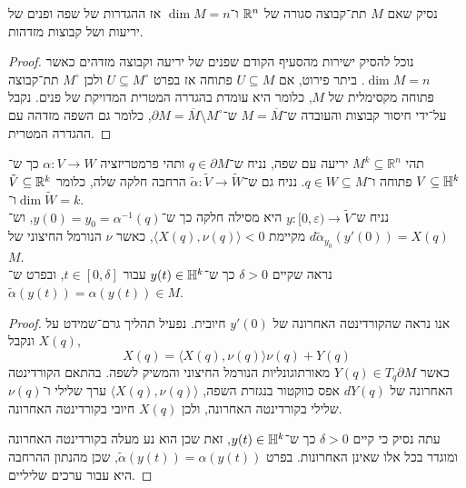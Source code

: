 \subquestion{}
נסיק שאם $M$ תת־קבוצה סגורה של $\mathbb{R}^n$ ו־$\dim M = n$ אז ההגדרות של שפה ופנים של יריעות ושל קבוצות מזדהות.
\begin{proof}
	נוכל להסיק ישירות מהסעיף הקודם שפנים של יריעה וקבוצה מזדהים כאשר $\dim M = n$.
	ביתר פירוט, אם $U \subseteq M$ פתוחה אז בפרט $U \subseteq M^\circ$ ולכן $M^\circ$ תת־קבוצה פתוחה מקסימלית של $M$, כלומר היא עומדת בהגדרה המטרית המדויקת של פנים.
	נקבל על־ידי חיסור קבוצות והעובדה ש־$M = \overline{M}$ ש־$\partial M = \overline{M} \setminus M^\circ$, כלומר גם השפה מזדהה עם ההגדרה המטרית.
\end{proof}

\question{}
תהי $M^k \subseteq \mathbb{R}^n$ יריעה עם שפה,
נניח ש־$q \in \partial M$ ותהי פרמטריזציה $\alpha : V \to W$ כך ש־$V \subseteq \mathbb{H}^k$ פתוחה ו־$q \in W \subseteq M$.
נניח גם ש־$\tilde{\alpha} : \tilde{V} \to \tilde{W}$ הרחבה חלקה שלה, כלומר $\tilde{V} \subseteq \mathbb{R}^k$ ו־$\dim \tilde{W} = k$. \\
נניח ש־$y : [0, \varepsilon) \to \tilde{V}$ היא מסילה חלקה כך ש־$y(0) = y_0 = \alpha^{-1}(q)$, וש־$d \tilde{\alpha}_{y_0}(y'(0)) = X(q)$ מקיימת $\langle X(q), \nu(q) \rangle < 0$,
כאשר $\nu$ הנורמל החיצוני של $M$. \\
נראה שקיים $\delta > 0$ כך ש־$y(t) \in \mathbb{H}^k$ עבור $t \in [0, \delta]$,
ובפרט ש־$\tilde{\alpha}(y(t)) = \alpha(y(t)) \in M$.
\begin{proof}
	אנו נראה שהקורדינטה האחרונה של $y'(0)$ חיובית.
	נפעיל תהליך גרם־שמידט על $X(q)$ ונקבל,
	\[
		X(q)
		= \langle X(q), \nu(q) \rangle \nu(q) + Y(q)
	\]
	כאשר $Y(q) \in T_q \partial M$ מאורתוגונליות הנורמל החיצוני והמשיק לשפה.
	בהתאם הקורדינטה האחרונה של $d Y(q)$ אפס כווקטור בנגזרת השפה, $\langle X(q), \nu(q) \rangle$ ערך שלילי ו־$\nu(q)$ שלילי בקורדינטה האחרונה, ולכן $X(q)$ חיובי בקורדינטה האחרונה.

	עתה נסיק כי קיים $\delta > 0$ כך ש־$y(t) \in \mathbb{H}^k$, זאת שכן הוא נע מעלה בקורדינטה האחרונה ומוגדר בכל אלו שאינן האחרונות.
	בפרט $\tilde{\alpha}(y(t)) = \alpha(y(t))$, שכן מהנתון ההרחבה היא עבור ערכים שליליים.
\end{proof}

